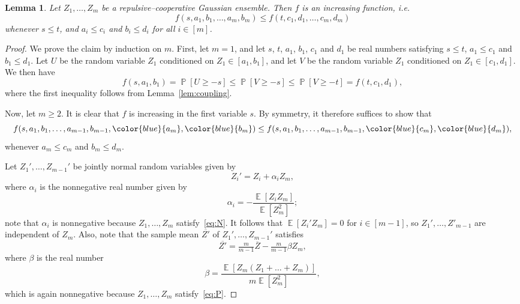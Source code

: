 \documentclass[12pt,english,reqno]{amsart}
\theoremstyle{plain}
\newtheorem{lemma}[thm]{Lemma}
\theoremstyle{remark}
\numberwithin{figure}{section}
\numberwithin{equation}{section}
\DeclareMathOperator{\Eb}{\mathbb{E}} %
\DeclareMathOperator{\Pb}{\mathbb{P}} %
\begin{document}
\begin{lemma}\label{lem:inc}
	Let $Z_1,\dots, Z_{m}$ be a repulsive–cooperative Gaussian ensemble. Then $f$ is an increasing function, i.e.
	\[ f(s,a_1,b_1,\dots, a_m, b_m) \leq f(t,c_1,d_1,\dots, c_m, d_m)\]
	whenever $s \leq t$, and $a_i \leq c_i$ and $b_i \leq d_i$ for all $i \in [m]$.
\end{lemma}

\begin{proof}
	We prove the claim by induction on $m$. First, let $m=1$, and let $s$, $t$, $a_1$, $b_1$, $c_1$ and $d_1$ be real numbers satisfying $s \leq t$, $a_1\leq c_1$ and $b_1 \leq d_1$. Let $U$ be the random variable $Z_1$ conditioned on $Z_1 \in [a_1,b_1]$, and let $V$ be the random variable $Z_1$ conditioned on $Z_1 \in [c_1,d_1]$. We then have
	\[
		f(s,a_1,b_1) = \Pb\left[ U \geq -s \right] \leq \Pb\left[ V \geq -s \right] \leq 	\Pb\left[ V \geq -t \right] = f(t,c_1,d_1),
	\]
	where the first inequality follows from Lemma~\ref{lem:coupling}.

	Now, let $m \geq 2$. It is clear that $f$ is increasing in the first variable $s$. By symmetry, it therefore suffices to show that
	\[ f(s,a_1,b_1,\dots, a_{m-1}, b_{m-1}, {\color{blue}{a_m}}, {\color{blue}{b_m}}) \leq f(s,a_1,b_1,\dots, a_{m-1}, b_{m-1}, {\color{blue}{c_m}}, {\color{blue}{d_m}}),\]
	whenever $a_m \leq c_m$ and $b_m \leq d_m$.

	Let $Z_1',\dots, Z_{m-1}'$ be jointly normal random variables given by
	\begin{equation}\label{eq:Y'}
		Z_i' = Z_i + \alpha_i Z_m,
	\end{equation}
	where $\alpha_i$ is the nonnegative real number given by
	\[ \alpha_i = - \frac{\Eb[Z_i Z_m]}{\Eb[Z_m^2]}; \]
	note that $\alpha_i$ is nonnegative because $Z_1,\dots, Z_m$ satisfy~\ref{eq:N}. It follows that $\Eb[Z_i' Z_m]=0$ for $i\in [m-1]$, so $Z_1',\dots, Z'_{m-1}$ are independent of $Z_m$. Also, note that the sample mean $\overline{Z'}$ of $Z_{1}',\dots, Z_{m-1}'$ satisfies
	\begin{equation}\label{eq:bY'}
		\overline{Z'} = \tfrac{m}{m-1} \overline{Z} - \tfrac{m}{m-1} \beta Z_m,
	\end{equation}
	where $\beta$ is the real number
	\[ \beta = \frac{\Eb[Z_m(Z_1+\dots+Z_m)]}{m \Eb[Z_m^2]}, \]
	which is again nonnegative because $Z_1,\dots, Z_m$ satisfy~\ref{eq:P}.


\end{proof}
\end{document}
